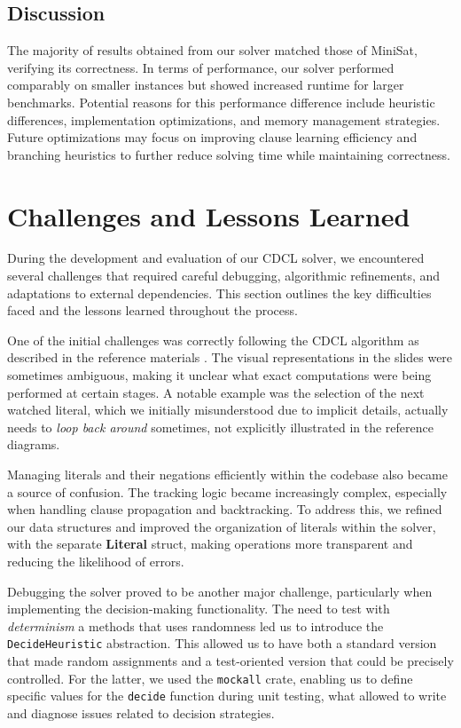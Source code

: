 \documentclass[a4paper,12pt]{article}
\begin{document}
\subsection{Discussion}
The majority of results obtained from our solver matched those of MiniSat, verifying its correctness.
In terms of performance, our solver performed comparably on smaller instances but showed increased
runtime for larger benchmarks. Potential reasons for this performance difference include heuristic
differences, implementation optimizations, and memory management strategies.
Future optimizations may focus on improving clause learning efficiency and branching heuristics to
further reduce solving time while maintaining correctness.


\section{Challenges and Lessons Learned}
\label{sec:challenges}

During the development and evaluation of our CDCL solver, we encountered several challenges that
required careful debugging, algorithmic refinements, and adaptations to external dependencies.
This section outlines the key difficulties faced and the lessons learned throughout the process.

One of the initial challenges was correctly following the CDCL algorithm as described in the
reference materials \cite{CdclAlgorithm}. The visual representations in the slides were
sometimes ambiguous, making it unclear what exact computations were being performed at certain
stages. A notable example was the selection of the next watched literal, which we initially
misunderstood due to implicit details, actually needs to \textit{loop back around} sometimes,
not explicitly illustrated in the reference diagrams.

Managing literals and their negations efficiently within the codebase also became a source of
confusion. The tracking logic became increasingly complex, especially when handling clause
propagation and backtracking. To address this, we refined our data structures and improved
the organization of literals within the solver, with the separate \textbf{Literal} struct,
making operations more transparent and reducing the likelihood of errors.

Debugging the solver proved to be another major challenge, particularly when implementing the
decision-making functionality. The need to test with \textit{determinism} a methods that uses
randomness led us to introduce the \texttt{DecideHeuristic} abstraction. This allowed us to
have both a standard version that made random assignments and a test-oriented version that could
be precisely controlled. For the latter, we used the \texttt{mockall} crate, enabling us to
define specific values for the \texttt{decide} function during unit testing, what allowed to
write and diagnose issues related to decision strategies.
\end{document}
